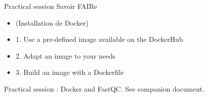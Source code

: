 \begin{frame}{Practical session}
Savoir FAIRe

\begin{itemize}
  \item (Installation de Docker)
  \item 1. Use a pre-defined image available on the DockerHub
  \item 2. Adapt an image to your needs
  \item 3. Build an image with a Dockerfile
\end{itemize}

Practical session : Docker and FastQC. See companion document.

\end{frame}


